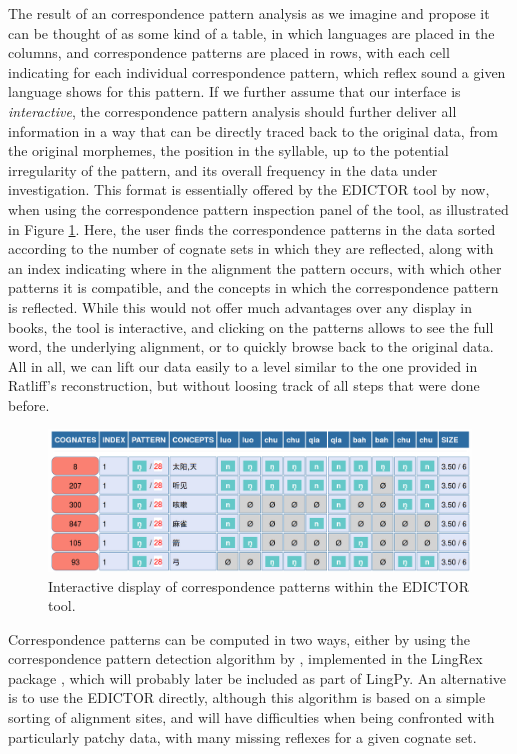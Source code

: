 \documentclass[xetex,svgnames]{scrartcl}
\begin{document}
The result of an correspondence pattern analysis as we imagine and propose it can be thought of as
some kind of a table, in which languages are placed in the columns, and correspondence patterns are
placed in rows, with each cell indicating for each individual correspondence pattern, which reflex
sound a given language shows for this pattern. If we further assume that our interface is
\emph{interactive}, the correspondence pattern analysis should further deliver all information in a
way that can be directly traced back to the original data, from the original morphemes, the position
in the syllable, up to the potential irregularity of the pattern, and its overall frequency in the
data under investigation. This format is essentially offered by the EDICTOR tool by now, when using
the correspondence pattern inspection panel of the tool, as illustrated in Figure \ref{fig:ede}.
Here, the user finds the correspondence patterns in the data sorted according to the number of
cognate sets in which they are reflected, along with an index indicating where in the alignment the
pattern occurs, with which other patterns it is compatible, and the concepts in which the
correspondence pattern is reflected. While this would not offer much advantages over any display in
books, the tool is interactive, and clicking on the patterns allows to see the full word, the
underlying alignment, or to quickly browse back to the original data. All in all, we can lift our
data easily to a level similar to the one provided in Ratliff's reconstruction, but without loosing
track of all steps that were done before.

\begin{figure}
  \centering
  \includegraphics[width=\textwidth]{edictor-hn.png}
  \caption{Interactive display of correspondence patterns within the EDICTOR tool.}
  \label{fig:ede}
\end{figure}

Correspondence patterns can be computed in two ways, either by using the correspondence pattern
detection algorithm by \citet{List2019a}, implemented in the LingRex package \citep{List2018j},
which will probably later be included as part of LingPy. An alternative is to use the EDICTOR
directly, although this algorithm is based on a simple sorting of alignment sites, and will have
difficulties when being confronted with particularly patchy data, with many missing reflexes for a
given cognate set.
\end{document}
